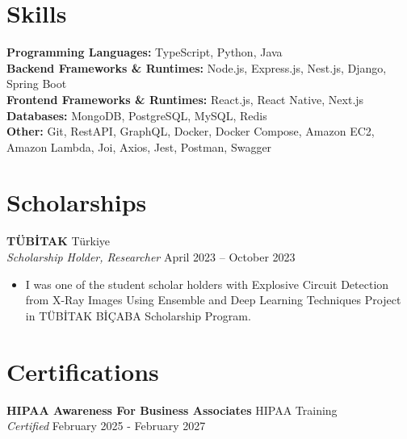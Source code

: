 \documentclass[10pt,a4paper]{extarticle}
\begin{document}
\section{Skills}
\textbf{Programming Languages:} TypeScript, Python, Java\\
\textbf{Backend Frameworks \& Runtimes:} Node.js, Express.js, Nest.js, Django, Spring Boot\\
\textbf{Frontend Frameworks \& Runtimes:} React.js, React Native, Next.js\\
\textbf{Databases:} MongoDB, PostgreSQL, MySQL, Redis\\
\textbf{Other:} Git, RestAPI, GraphQL, Docker, Docker Compose, Amazon EC2, Amazon Lambda, Joi, Axios, Jest, Postman, Swagger
\section{Scholarships}
\textbf{TÜBİTAK} \hfill Türkiye\\
\textit{Scholarship Holder, Researcher} \hfill April 2023 -- October 2023
\begin{itemize}[leftmargin=*,noitemsep,topsep=0pt]
    \item I was one of the student scholar holders with Explosive Circuit Detection from X-Ray Images Using Ensemble and Deep Learning Techniques Project in TÜBİTAK BİÇABA Scholarship Program.
\end{itemize}
\section{Certifications}
\textbf{HIPAA Awareness For Business Associates} \hfill HIPAA Training\\
\textit{Certified} \hfill February 2025 - February 2027
\end{document}
